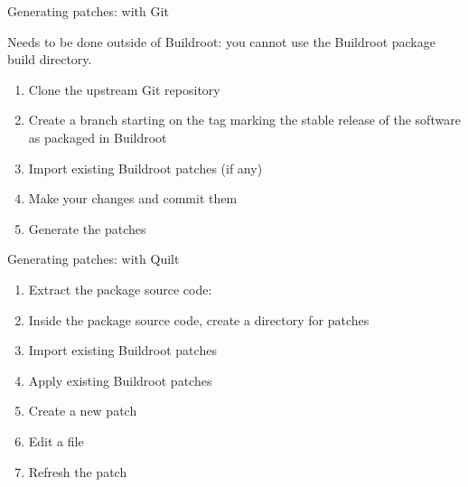 \begin{frame}{Generating patches: with Git}

  Needs to be done outside of Buildroot: you cannot use the Buildroot
  package build directory.

  \begin{enumerate}
  \item Clone the upstream Git repository\\
  \item Create a branch starting on the tag marking the stable
    release of the software as packaged in Buildroot\\
  \item Import existing Buildroot patches (if any)\\
  \item Make your changes and commit them\\
  \item Generate the patches\\
  \end{enumerate}

\end{frame}

\begin{frame}{Generating patches: with Quilt}

  \begin{enumerate}
  \item Extract the package source code:
  \item Inside the package source code, create a directory for patches\\
  \item Import existing Buildroot patches\\
  \item Apply existing Buildroot patches\\
  \item Create a new patch\\
  \item Edit a file\\
  \item Refresh the patch\\
  \end{enumerate}

\end{frame}

